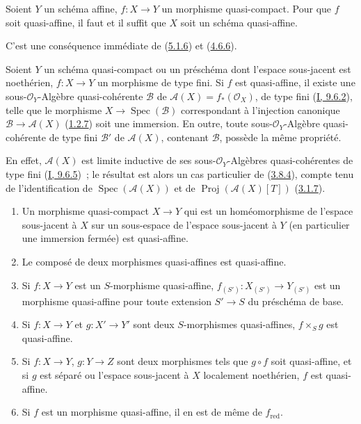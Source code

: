 \begin{corollary}[5.1.8]
\label{II.5.1.8-fr}
Soient $Y$ un schéma affine, $f:X\to Y$ un morphisme quasi-compact. Pour que
$f$ soit quasi-affine, il faut et il suffit que $X$ soit un schéma
quasi-affine.
\end{corollary}

C'est une conséquence immédiate de (\hyperref[II.5.1.6-fr]{5.1.6}) et
(\hyperref[II.4.6.6-fr]{4.6.6}).

\begin{corollary}[5.1.9]
\label{II.5.1.9-fr}
Soient $Y$ un schéma quasi-compact ou un préschéma dont l'espace sous-jacent
est noethérien, $f:X\to Y$ un morphisme de type fini. Si $f$ est
quasi-affine, il existe une sous-$\mathcal{O}_Y$-Algèbre quasi-cohérente
$\mathcal{B}$ de $\mathcal{A}(X)=f_*(\mathcal{O}_X)$, de type fini
(\hyperref[I.9.6.2-fr]{I, 9.6.2}), telle que le morphisme
$X\to\operatorname{Spec}(\mathcal{B})$ correspondant à l'injection canonique
$\mathcal{B}\to\mathcal{A}(X)$ (\hyperref[II.1.2.7-fr]{1.2.7}) soit une
immersion. En outre, toute sous-$\mathcal{O}_Y$-Algèbre quasi-cohérente de
type fini $\mathcal{B}'$ de $\mathcal{A}(X)$, contenant $\mathcal{B}$,
possède la même propriété.
\end{corollary}

En effet, $\mathcal{A}(X)$ est limite inductive de ses
sous-$\mathcal{O}_Y$-Algèbres quasi-cohérentes de type fini
(\hyperref[I.9.6.5-fr]{I, 9.6.5})~; le résultat est alors un cas particulier
de (\hyperref[II.3.8.4-fr]{3.8.4}), compte tenu de l'identification de
$\operatorname{Spec}(\mathcal{A}(X))$ et de
$\operatorname{Proj}(\mathcal{A}(X)[T])$
(\hyperref[II.3.1.7-fr]{3.1.7}).

\begin{proposition}[5.1.10]
\label{II.5.1.10-fr}
\begin{enumerate}
  \item[\rm{(i)}] Un morphisme quasi-compact $X\to Y$ qui est un
  homéomorphisme de l'espace sous-jacent à $X$ sur un sous-espace de
  l'espace sous-jacent à $Y$ (en particulier une immersion fermée) est
  quasi-affine.
  \item[\rm{(ii)}] Le composé de deux morphismes quasi-affines est
  quasi-affine.
  \item[\rm{(iii)}] Si $f:X\to Y$ est un $S$-morphisme quasi-affine,
  $f_{(S')}:X_{(S')}\to Y_{(S')}$ est un morphisme quasi-affine pour toute
  extension $S'\to S$ du préschéma de base.
  \item[\rm{(iv)}] Si $f:X\to Y$ et $g:X'\to Y'$ sont deux $S$-morphismes
  quasi-affines, $f\times_S g$ est quasi-affine.
  \item[\rm{(v)}] Si $f:X\to Y$, $g:Y\to Z$ sont deux morphismes tels que
  $g\circ f$ soit quasi-affine, et si $g$ est séparé ou l'espace sous-jacent
  à $X$ localement noethérien, $f$ est quasi-affine.
  \item[\rm{(vi)}] Si $f$ est un morphisme quasi-affine, il en est de même
  de $f_{\mathrm{red}}$.
\end{enumerate}
\end{proposition}

